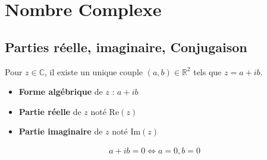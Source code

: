 \chapter{Nombre Complexe} %
\label{chap:Nombre Complexe}

\section{Parties réelle, imaginaire, Conjugaison} %
\label{sec:Parties réelle, imaginaire, Conjugaison}

\begin{Definition}[colbacktitle=red!75!black]{}{}
Pour $z \in \mathbb{C}$, il existe un unique couple $(a,b) \in \mathbb{R} ^{2}$  tels que $z = a+ib$.
\begin{itemize}

    \item \textbf{Forme algébrique} de $z$ : $a+ib$
    \item \textbf{Partie réelle} de $z$ noté $\mathrm{Re}(z)$
    \item \textbf{Partie imaginaire} de $z$ noté $\text{Im}(z)$

\end{itemize}
\end{Definition}

\begin{Prop}{}{}
\begin{gather}
  a + ib = 0 \iff a = 0, b=0
\end{gather}
\end{Prop}




